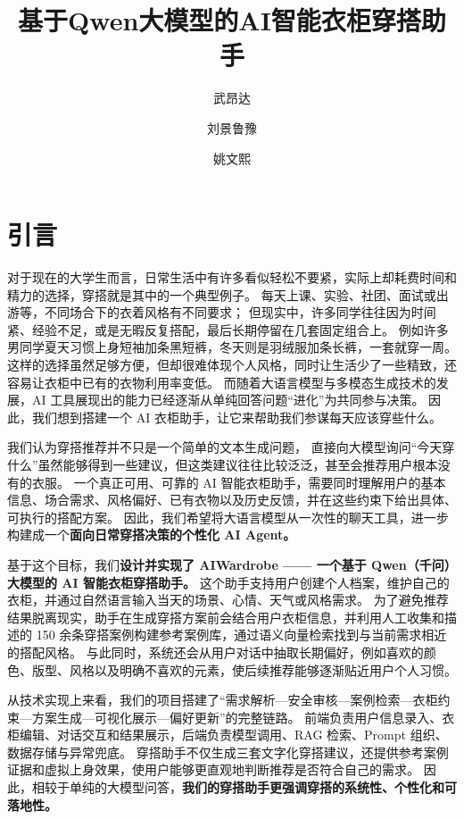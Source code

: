 \documentclass{applemlr}
\title{基于Qwen大模型的AI智能衣柜穿搭助手}
\author{武昂达}
\author{刘景鲁豫}
\author{姚文熙}
\affiliation{上海交通大学自动化与感知学院}
\begin{document}
\maketitle

\tableofcontents
\newpage

\section{引言}

对于现在的大学生而言，日常生活中有许多看似轻松不要紧，实际上却耗费时间和精力的选择，穿搭就是其中的一个典型例子。
每天上课、实验、社团、面试或出游等，不同场合下的衣着风格有不同要求；
但现实中，许多同学往往因为时间紧、经验不足，或是无暇反复搭配，最后长期停留在几套固定组合上。
例如许多男同学夏天习惯上身短袖加条黑短裤，冬天则是羽绒服加条长裤，一套就穿一周。
这样的选择虽然足够方便，但却很难体现个人风格，同时让生活少了一些精致，还容易让衣柜中已有的衣物利用率变低。
而随着大语言模型与多模态生成技术的发展，AI 工具展现出的能力已经逐渐从单纯回答问题“进化”为共同参与决策。
因此，我们想到搭建一个 AI 衣柜助手，让它来帮助我们参谋每天应该穿些什么。

我们认为穿搭推荐并不只是一个简单的文本生成问题，
直接向大模型询问“今天穿什么”虽然能够得到一些建议，但这类建议往往比较泛泛，甚至会推荐用户根本没有的衣服。
一个真正可用、可靠的 AI 智能衣柜助手，需要同时理解用户的基本信息、场合需求、风格偏好、已有衣物以及历史反馈，并在这些约束下给出具体、可执行的搭配方案。
因此，我们希望将大语言模型从一次性的聊天工具，进一步构建成一个\textbf{面向日常穿搭决策的个性化 AI Agent。}

基于这个目标，我们\textbf{设计并实现了 AIWardrobe —— 一个基于 Qwen（千问）大模型的 AI 智能衣柜穿搭助手。}
这个助手支持用户创建个人档案，维护自己的衣柜，并通过自然语言输入当天的场景、心情、天气或风格需求。
为了避免推荐结果脱离现实，助手在生成穿搭方案前会结合用户衣柜信息，并利用人工收集和描述的 150 余条穿搭案例构建参考案例库，通过语义向量检索找到与当前需求相近的搭配风格。
与此同时，系统还会从用户对话中抽取长期偏好，例如喜欢的颜色、版型、风格以及明确不喜欢的元素，使后续推荐能够逐渐贴近用户个人习惯。

从技术实现上来看，我们的项目搭建了“需求解析—安全审核—案例检索—衣柜约束—方案生成—可视化展示—偏好更新”的完整链路。
前端负责用户信息录入、衣柜编辑、对话交互和结果展示，后端负责模型调用、RAG 检索、Prompt 组织、数据存储与异常兜底。
穿搭助手不仅生成三套文字化穿搭建议，还提供参考案例证据和虚拟上身效果，使用户能够更直观地判断推荐是否符合自己的需求。
因此，相较于单纯的大模型问答，\textbf{我们的穿搭助手更强调穿搭的系统性、个性化和可落地性。}
\end{document}
